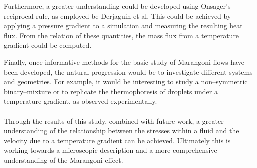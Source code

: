 Furthermore, a greater understanding could be developed using Onsager's reciprocal rule, as employed be Derjaguin et al.
This could be achieved by applying a pressure gradient to a simulation and measuring the resulting heat flux.
From the relation of these quantities, the mass flux from a temperature gradient could be computed. 

Finally, once informative methods for the basic study of Marangoni flows have been developed, the natural progression would be to investigate different systems and geometries.
For example, it would be interesting to study a non--symmetric binary--mixture or to replicate the thermophoresis of droplets under a temperature gradient, as observed experimentally.
\\
\\
\indent Through the results of this study, combined with future work, a greater understanding of the relationship between the stresses within a fluid and the velocity due to a temperature gradient can be achieved. 
Ultimately this is working towards a microscopic description and a more comprehensive understanding of the Marangoni effect.
